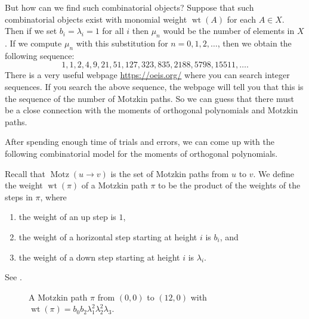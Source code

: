 \documentclass[oneside]{book}
\numberwithin{equation}{section}
\theoremstyle{definition}
\newcommand\Motz{\operatorname{Motz}}
\newcommand\wt{\operatorname{wt}}
\begin{document}
But how can we find such combinatorial objects? Suppose that such
combinatorial objects exist with monomial weight \( \wt(A) \) for each
\( A\in X \). Then if we set \( b_i=\lambda_i=1 \) for all \( i \)
then \( \mu_n \) would be the number of elements in \( X \). If we
compute \( \mu_n \) with this substitution for \( n=0,1,2,\ldots \),
then we obtain the following sequence:
\[
  1, 1, 2, 4, 9, 21, 51, 127, 323, 835, 2188, 5798, 15511, \ldots.
\]
There is a very useful webpage \url{https://oeis.org/} where you can
search integer sequences. If you search the above sequence, the
webpage will tell you that this is the sequence of the number of
Motzkin paths. So we can guess that there must be a close connection
with the moments of orthogonal polynomials and Motzkin paths.

After spending enough time of trials and errors, we can come up with
the following combinatorial model for the moments of orthogonal
polynomials.

Recall that \( \Motz(u\to v) \) is the set of Motzkin paths from
\( u \) to \( v \). We define the weight \( \wt(\pi) \) of a Motzkin
path \( \pi \) to be the product of the weights of the steps in
\( \pi \), where
\begin{enumerate}
\item the weight of an up step is \( 1 \),
\item the weight of a horizontal step starting at height \( i \) is \( b_i \), and
\item the weight of a down step starting at height \( i \) is
  \( \lambda_i \).
\end{enumerate}
See .

\begin{figure}
  \centering
\caption{A Motzkin path $\pi$ from $(0,0)$ to $(12,0)$ with
  $\wt(\pi)=b_0b_2\lambda_1^2\lambda_2^2\lambda_3$.}
  \label{fig:Motzkin-wt}
\end{figure}
\end{document}
